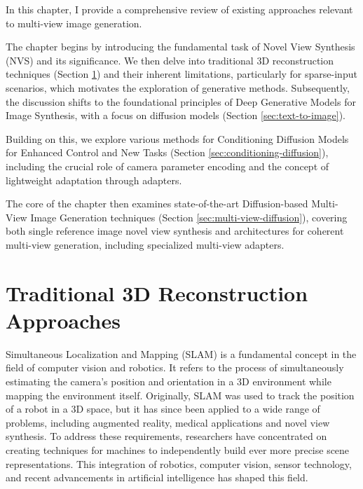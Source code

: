\label{chapter:related}

In this chapter, I provide a comprehensive review of existing approaches relevant to multi-view image generation.

The chapter begins by introducing the fundamental task of Novel View Synthesis (NVS) and its significance. We then delve into traditional 3D reconstruction techniques (Section \ref{sec:3d-reconstruction}) and their inherent limitations, particularly for sparse-input scenarios, which motivates the exploration of generative methods. Subsequently, the discussion shifts to the foundational principles of Deep Generative Models for Image Synthesis, with a focus on diffusion models (Section \ref{sec:text-to-image}).

Building on this, we explore various methods for Conditioning Diffusion Models for Enhanced Control and New Tasks (Section \ref{sec:conditioning-diffusion}), including the crucial role of camera parameter encoding and the concept of lightweight adaptation through adapters.

The core of the chapter then examines state-of-the-art Diffusion-based Multi-View Image Generation techniques (Section \ref{sec:multi-view-diffusion}), covering both single reference image novel view synthesis and architectures for coherent multi-view generation, including specialized multi-view adapters.

\section{Traditional 3D Reconstruction Approaches}\label{sec:3d-reconstruction}

Simultaneous Localization and Mapping (SLAM) is a fundamental concept in the field of computer vision and robotics. It refers to the process of simultaneously estimating the camera's position and orientation in a 3D environment while mapping the environment itself. Originally, SLAM was used to track the position of a robot in a 3D space, but it has since been applied to a wide range of problems, including augmented reality, medical applications and novel view synthesis. To address these requirements, researchers have concentrated on creating techniques for machines to independently build ever more precise scene representations. This integration of robotics, computer vision, sensor technology, and recent advancements in artificial intelligence has shaped this field.

